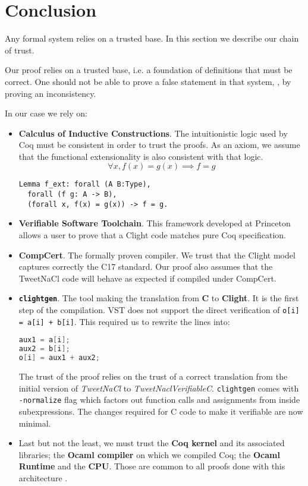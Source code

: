 \section{Conclusion}
\label{sec:Conclusion}

Any formal system relies on a trusted base. In this section we describe our
chain of trust.

Our proof relies on a trusted base, i.e. a foundation of definitions that must be
correct. One should not be able to prove a false statement in that system, \eg, by
proving an inconsistency.

In our case we rely on:
\begin{itemize}
  \item \textbf{Calculus of Inductive Constructions}. The intuitionistic logic
  used by Coq must be consistent in order to trust the proofs. As an axiom,
  we assume that the functional extensionality is also consistent with that logic.
  $$\forall x, f(x) = g(x) \implies f = g$$
\begin{lstlisting}[language=Coq]
Lemma f_ext: forall (A B:Type),
  forall (f g: A -> B),
  (forall x, f(x) = g(x)) -> f = g.
\end{lstlisting}

  \item \textbf{Verifiable Software Toolchain}. This framework developed at
  Princeton allows a user to prove that a Clight code matches pure Coq
  specification.

  \item \textbf{CompCert}. The formally proven compiler. We trust that the Clight
  model captures correctly the C17 standard.
  Our proof also assumes that the TweetNaCl code will behave as expected if
  compiled under CompCert.

  \item \textbf{\texttt{clightgen}}. The tool making the translation from \textbf{C} to
  \textbf{Clight}. It is the first step of the compilation.
  VST does not support the direct verification of \texttt{o[i] = a[i] + b[i]}.
  This required us to rewrite the lines into:
\begin{lstlisting}[language=C]
aux1 = a[i];
aux2 = b[i];
o[i] = aux1 + aux2;
\end{lstlisting}
  The trust of the proof relies on the trust of a correct translation from the
  initial version of \emph{TweetNaCl} to \emph{TweetNaclVerifiableC}.
  \texttt{clightgen} comes with \texttt{-normalize} flag which
  factors out function calls and assignments from inside subexpressions.
  The changes required for C code to make it verifiable are now minimal.

  \item Last but not the least, we must trust the \textbf{Coq kernel} and its
  associated libraries; the \textbf{Ocaml compiler} on which we compiled Coq;
  the \textbf{Ocaml Runtime} and the \textbf{CPU}. Those are common to all proofs
  done with this architecture \cite{2015-Appel,coq-faq}.
\end{itemize}

